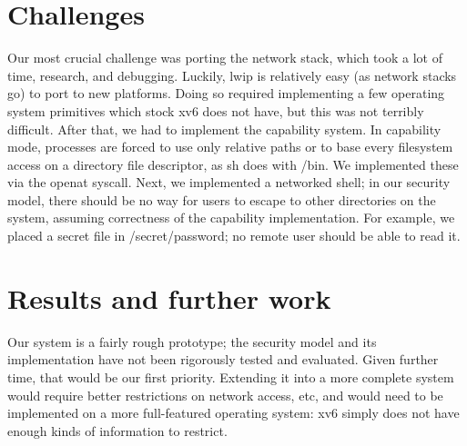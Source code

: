 \documentclass[12pt]{article}
\begin{document}
\section{Challenges}
Our most crucial challenge was porting the network stack, which took a lot of time, research, and debugging. Luckily, lwip is relatively easy (as network stacks go) to port to new platforms. Doing so required implementing a few operating system primitives which stock xv6 does not have, but this was not terribly difficult. After that, we had to implement the capability system. In capability mode, processes are forced to use only relative paths or to base every filesystem access on a directory file descriptor, as sh does with /bin. We implemented these via the openat syscall. Next, we implemented a networked shell; in our security model, there should be no way for users to escape to other directories on the system, assuming correctness of the capability implementation. For example, we placed a secret file in /secret/password; no remote user should be able to read it. 

\section{Results and further work}
Our system is a fairly rough prototype; the security model and its implementation have not been rigorously tested and evaluated. Given further time, that would be our first priority. Extending it into a more complete system would require better restrictions on network access, etc, and would need to be implemented on a more full-featured operating system: xv6 simply does not have enough kinds of information to restrict.
\end{document}
